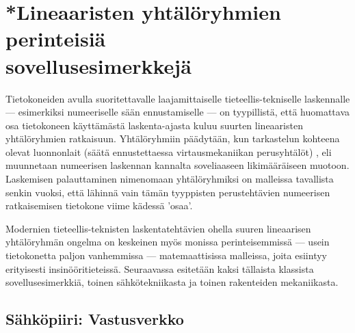 \section[Lineaaristen yhtälöryhmien sovellusesimerkkejä]{*Lineaaristen yhtälöryhmien 
perinteisiä \\ sovellusesimerkkejä} 
\label{yhtälöryhmät} 
\alku

Tietokoneiden avulla suoritettavalle laajamittaiselle tieteellis-tekniselle laskennalle 
--- esimerkiksi numeeriselle sään ennustamiselle --- on tyypillistä, että huomattava osa 
tietokoneen käyttämästä laskenta-ajasta kuluu suurten lineaaristen yhtälöryhmien ratkaisuun. 
Yhtälöryhmiin päädytään, kun tarkastelun kohteena olevat luonnonlait (säätä ennustettaessa 
virtausmekaniikan perusyhtälöt) , eli muunnetaan numeerisen laskennan 
kannalta soveliaaseen likimääräiseen muotoon. Laskemisen palauttaminen nimenomaan
 yhtälöryhmiksi on malleissa tavallista senkin vuoksi, että lähinnä
vain tämän tyyppisten perustehtävien numeerisen ratkaisemisen tietokone viime kädessä 'osaa'.

Modernien tieteellis-teknisten laskentatehtävien ohella suuren lineaarisen yhtälöryhmän ongelma
on keskeinen myös monissa perinteisemmissä --- usein tietokonetta paljon vanhemmissa --- 
matemaattisissa malleissa, joita esiintyy erityisesti insinööritieteissä. Seuraavassa esitetään
kaksi tällaista klassista sovellusesimerkkiä, toinen sähkötekniikasta ja toinen rakenteiden 
mekaniikasta.

\subsection{Sähköpiiri: Vastusverkko}

